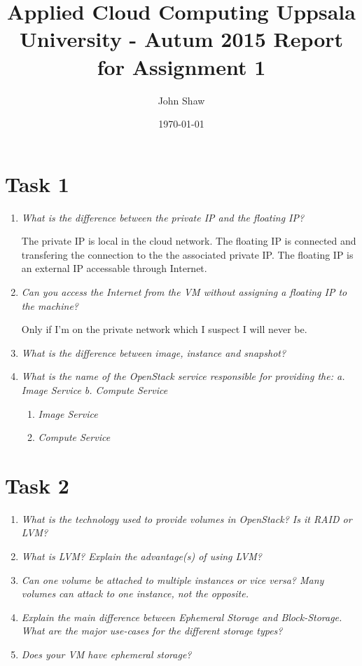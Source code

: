 \documentclass[a4paper]{article}
\title{Applied Cloud Computing
Uppsala University - Autum 2015
Report for Assignment 1}
\author{John Shaw}
\date{\today}
\begin{document}
\maketitle

\section*{Task 1}

\begin{enumerate}
    \item \textit{What is the difference between the private IP and the floating IP?}
    
    The private IP is local in the cloud network. The floating IP is connected and transfering the connection to the the associated private IP. The floating IP is an external IP accessable through Internet.
    \item \textit{Can you access the Internet from the VM without assigning a floating IP to the machine?}
    
    Only if I'm on the private network which I suspect I will never be.
    \item \textit{What is the difference between image, instance and snapshot?}
    
    
    \item \textit{What is the name of the OpenStack service responsible for providing the: a. Image Service b. Compute Service}
    
        \begin{enumerate}
            \item \textit{Image Service}
            
            \item \textit{Compute Service}
            
        \end{enumerate}
\end{enumerate}

\section*{Task 2}

\begin{enumerate}
    \item \textit{What is the technology used to provide volumes in OpenStack? Is it RAID or LVM?}
    \item \textit{What is LVM? Explain the advantage(s) of using LVM?}
    \item \textit{Can one volume be attached to multiple instances or vice versa? Many volumes can attack to one instance, not the opposite.}
    \item \textit{Explain the main difference between Ephemeral Storage and Block-Storage. What are the major use-cases for the different storage types?}
    \item \textit{Does your VM have ephemeral storage?}
\end{enumerate}
\end{document}
